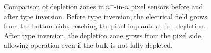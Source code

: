  \begin{figure}[htbp]
 	\centering
 	\hfill
 	\caption{Comparison of depletion zones in $n^+$-in-$n$ pixel sensors before and after type inversion. Before type inversion, the electrical field grows from the bottom side, reaching the pixel implants at full depletion. After type inversion, the depletion zone grows from the pixel side, allowing operation even if the bulk is not fully depleted.}
 	\label{fig:ATLAS-pixel}
 \end{figure}

